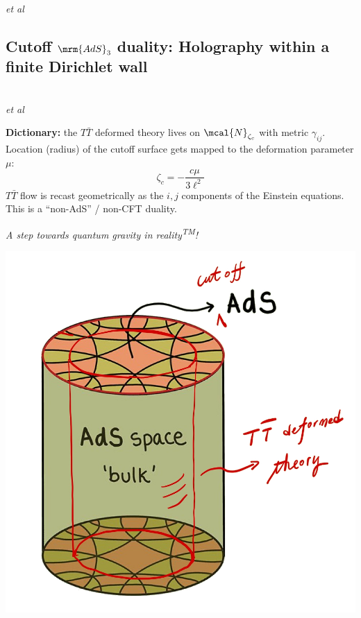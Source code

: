 \documentclass[10pt]{article}
\newcommand{\citations}[1]{{\footnotesize#1\par}}
\newcommand{\reality}{reality\textsuperscript{TM}}
\newcommand{\TTbar}{\texorpdfstring{\ensuremath{T\bar{T}}}{TTbar}\xspace}
\begin{document}
\begin{multicols}{3}
\begin{itemize}
\citations{
\textcite{Zamolodchikov:2004ce}\\
\textcite{Dubovsky:2012wk}\\
\textcite{Dubovsky:2013ira}\\
\textcite{Smirnov:2016lqw}\\
\textcite{Cavaglia:2016oda}\\
\textcite{Dubovsky:2017cnj} \textit{et al}
}

\vspace{-.5\baselineskip}

\end{itemize}

\subsection*{Cutoff $\mrm{AdS}_3$ duality:\texstringonly{\\} Holography within a finite Dirichlet wall}

\citations{
\textcite{McGough:2016lol}\\
\textcite{Kraus:2018xrn} \textit{et al}
}

\textbf{Dictionary:} the \TTbar deformed theory lives on $\mcal{N}_{\zeta_c}$ with metric $\gamma_{ij}$.
Location (radius) of the cutoff surface gets mapped to the deformation parameter $\mu$:
\begin{equation}
	\zeta_c = - \frac{c \mu}{3\ell^2}
	\label{dictionary}
\end{equation}
\TTbar flow is recast geometrically as the $i,j$ components of the Einstein equations. This is a ``non-AdS'' / non-CFT duality.

\noindent%
\textit{A step towards quantum gravity in \reality!}

\columnbreak

\vspace*{-4\baselineskip}
\begin{center}
	\hspace{.1\linewidth}
	\includegraphics[width=.4\linewidth]{img/cutoff-ads.jpg}
	

\end{center}
\end{multicols}
\end{document}
